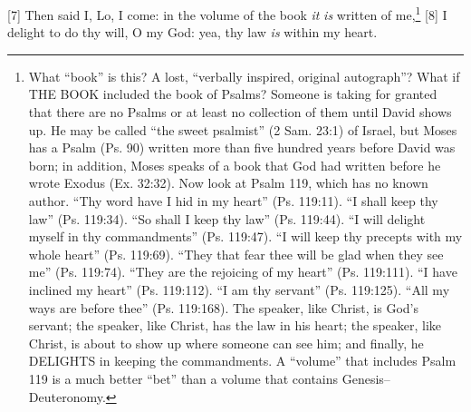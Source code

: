 [7] \textcolor[rgb]{0.00,0.00,1.00}{Then said I, Lo, I come: in the volume of the book \emph{it} \emph{is} written of me,}\footnote{What “book” is this? A lost, “verbally inspired, original autograph”? What if THE BOOK included the book of Psalms? Someone is taking for granted that there are no Psalms or at least no collection of them until David shows up. He may be called “the sweet psalmist” (2 Sam. 23:1) of Israel, but Moses has a Psalm (Ps. 90) written more than five hundred years before David was born; in addition, Moses speaks of a book that God had written before he wrote Exodus (Ex. 32:32). Now look at Psalm 119, which has no known author. “Thy word have I hid in my heart” (Ps. 119:11). “I shall keep thy law” (Ps. 119:34). “So shall I keep thy law” (Ps. 119:44). “I will delight myself in thy commandments” (Ps. 119:47). “I will keep thy precepts with my whole heart” (Ps. 119:69). “They that fear thee will be glad when they see me” (Ps. 119:74). “They are the rejoicing of my heart” (Ps. 119:111). “I have inclined my heart” (Ps. 119:112). “I am thy servant” (Ps. 119:125). “All my ways are before thee” (Ps. 119:168). The speaker, like Christ, is God’s servant; the speaker, like Christ, has the law in his heart; the speaker, like Christ, is about to show up where someone can see him; and finally, he DELIGHTS in keeping the commandments. A “volume” that includes Psalm 119 is a much better “bet” than a volume that contains Genesis–Deuteronomy.}
[8] \textcolor[rgb]{0.00,0.00,1.00}{I delight to do thy will, O my God: yea, thy law \emph{is} within my heart.}
